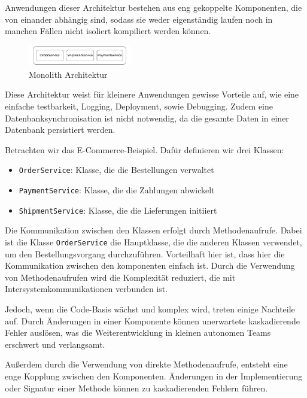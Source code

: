 \documentclass[acmtog]{acmart}
\begin{document}
Anwendungen dieser Architektur bestehen aus eng gekoppelte Komponenten, die von
einander abhängig sind, sodass sie weder eigenständig laufen noch in manchen Fällen
nicht isoliert kompiliert werden können. \cite{mono3}


\begin{figure}[h!]
    \centering
    \includegraphics[width=0.4\textwidth]{images/mono/mono.pdf}
    \caption{Monolith Architektur}
    \label{fig:mono}
\end{figure}

Diese Architektur weist für kleinere Anwendungen gewisse Vorteile auf,
wie eine einfache testbarkeit, Logging, Deployment, sowie Debugging.
Zudem eine Datenbanksynchronisation ist nicht notwendig, da die
gesamte Daten in einer Datenbank persistiert werden. \cite[2]{mono4}

Betrachten wir das E-Commerce-Beispiel.
Dafür definieren wir drei Klassen:
\begin{itemize}
    \item \texttt{OrderService}: Klasse, die die Bestellungen verwaltet
    \item \texttt{PaymentService}: Klasse, die die Zahlungen abwickelt
    \item \texttt{ShipmentService}: Klasse, die die Lieferungen initiiert
\end{itemize}

Die Kommunikation zwischen den Klassen erfolgt durch Methodenaufrufe.
Dabei ist die Klasse \texttt{OrderService} die Hauptklasse, die die anderen Klassen
verwendet, um den Bestellungsvorgang durchzuführen.
Vorteilhaft hier ist, dass hier die Kommunikation zwischen den komponenten einfach ist.
Durch die Verwendung von Methodenaufrufen wird die Komplexität reduziert, die mit
Intersystemkommunikationen verbunden ist.

Jedoch, wenn die Code-Basis wächst und komplex wird, treten einige Nachteile auf.
Durch Änderungen in einer Komponente können unerwartete kaskadierende Fehler
auslösen, was die Weiterentwicklung in kleinen autonomen
Teams erschwert und verlangsamt.

Außerdem durch die Verwendung von direkte Methodenaufrufe, entsteht eine enge Kopplung
zwischen den Komponenten.
Änderungen in der Implementierung oder Signatur einer Methode
können zu kaskadierenden Fehlern führen.
\end{document}
